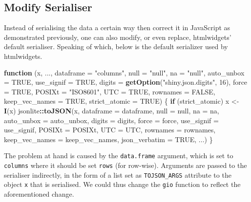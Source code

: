 \documentclass[
]{krantz}
\makeatletter
\newenvironment{Shaded}{\begin{snugshade}}{\end{snugshade}}
\newcommand{\ControlFlowTok}[1]{\textcolor[rgb]{0.27,0.27,0.27}{\textbf{#1}}}
\newcommand{\DataTypeTok}[1]{\textcolor[rgb]{0.27,0.27,0.27}{#1}}
\newcommand{\DecValTok}[1]{\textcolor[rgb]{0.06,0.06,0.06}{#1}}
\newcommand{\KeywordTok}[1]{\textcolor[rgb]{0.27,0.27,0.27}{\textbf{#1}}}
\newcommand{\NormalTok}[1]{#1}
\newcommand{\OperatorTok}[1]{\textcolor[rgb]{0.43,0.43,0.43}{\textbf{#1}}}
\newcommand{\OtherTok}[1]{\textcolor[rgb]{0.37,0.37,0.37}{#1}}
\newcommand{\StringTok}[1]{\textcolor[rgb]{0.5,0.5,0.5}{#1}}
\newenvironment{kframe}{%
\medskip{}
\setlength{\fboxsep}{.8em}
 \def\at@end@of@kframe{}%
 \ifinner\ifhmode%
  \def\at@end@of@kframe{\end{minipage}}%
  \begin{minipage}{\columnwidth}%
 \fi\fi%
 \def\FrameCommand##1{\hskip\@totalleftmargin \hskip-\fboxsep
 \colorbox{shadecolor}{##1}\hskip-\fboxsep
     \hskip-\linewidth \hskip-\@totalleftmargin \hskip\columnwidth}%
 \MakeFramed {\advance\hsize-\width
   \@totalleftmargin\z@ \linewidth\hsize
   \@setminipage}}%
 {\par\unskip\endMakeFramed%
 \at@end@of@kframe}
\renewenvironment{Shaded}{\begin{kframe}}{\end{kframe}}
\makeatother
\begin{document}
\hypertarget{widgets-full-transform-data-modify}{%
\subsection{Modify Serialiser}\label{widgets-full-transform-data-modify}}

Instead of serialising the data a certain way then correct it in JavaScript as demonstrated previously, one can also modify, or even replace, htmlwidgets' default serialiser. Speaking of which, below is the default serializer used by htmlwidgets.

\begin{Shaded}
\begin{Highlighting}[]
\ControlFlowTok{function}\NormalTok{ (x, ..., }\DataTypeTok{dataframe =} \StringTok{"columns"}\NormalTok{, }\DataTypeTok{null =} \StringTok{"null"}\NormalTok{, }
\DataTypeTok{na =} \StringTok{"null"}\NormalTok{, }\DataTypeTok{auto\_unbox =} \OtherTok{TRUE}\NormalTok{, }\DataTypeTok{use\_signif =} \OtherTok{TRUE}\NormalTok{, }
  \DataTypeTok{digits =} \KeywordTok{getOption}\NormalTok{(}\StringTok{"shiny.json.digits"}\NormalTok{, }\DecValTok{16}\NormalTok{), }\DataTypeTok{force =} \OtherTok{TRUE}\NormalTok{,}
  \DataTypeTok{POSIXt =} \StringTok{"ISO8601"}\NormalTok{, }\DataTypeTok{UTC =} \OtherTok{TRUE}\NormalTok{, }\DataTypeTok{rownames =} \OtherTok{FALSE}\NormalTok{, }
  \DataTypeTok{keep\_vec\_names =} \OtherTok{TRUE}\NormalTok{, }\DataTypeTok{strict\_atomic =} \OtherTok{TRUE}\NormalTok{) }
\NormalTok{\{}
  \ControlFlowTok{if}\NormalTok{ (strict\_atomic) }
\NormalTok{      x <{-}}\StringTok{ }\KeywordTok{I}\NormalTok{(x)}
\NormalTok{  jsonlite}\OperatorTok{::}\KeywordTok{toJSON}\NormalTok{(x, }\DataTypeTok{dataframe =}\NormalTok{ dataframe, }\DataTypeTok{null =}\NormalTok{ null, }\DataTypeTok{na =}\NormalTok{ na, }
    \DataTypeTok{auto\_unbox =}\NormalTok{ auto\_unbox, }\DataTypeTok{digits =}\NormalTok{ digits, }\DataTypeTok{force =}\NormalTok{ force, }
    \DataTypeTok{use\_signif =}\NormalTok{ use\_signif, }\DataTypeTok{POSIXt =}\NormalTok{ POSIXt, }\DataTypeTok{UTC =}\NormalTok{ UTC, }
    \DataTypeTok{rownames =}\NormalTok{ rownames, }\DataTypeTok{keep\_vec\_names =}\NormalTok{ keep\_vec\_names, }
    \DataTypeTok{json\_verbatim =} \OtherTok{TRUE}\NormalTok{, ...)}
\NormalTok{\}}
\end{Highlighting}
\end{Shaded}

The problem at hand is caused by the \texttt{data.frame} argument, which is set to \texttt{columns} where it should be set \texttt{rows} (for row-wise). Arguments are passed to the serialiser indirectly, in the form of a list set as \texttt{TOJSON\_ARGS} attribute to the object \texttt{x} that is serialised. We could thus change the \texttt{gio} function to reflect the aforementioned change.
\end{document}
